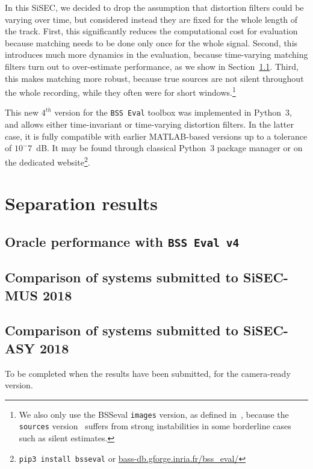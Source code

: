\documentclass{llncs}
\begin{document}
In this SiSEC, we decided to drop the assumption that distortion filters could be varying over time, but considered instead they are fixed for the whole length of the track. First, this significantly reduces the computational cost for evaluation because matching needs to be done only once for the whole signal. Second, this introduces much more dynamics in the evaluation, because time-varying matching filters turn out to over-estimate performance, as we show in Section~\ref{ssec:bsseval-results}. Third, this makes matching more robust, because true sources are not silent throughout the whole recording, while they often were for short windows.\footnote{We also only use the BSSeval \texttt{images} version, as defined in~\cite{bssevalv3}, because the \texttt{sources} version~\cite{bssevalv2} suffers from strong instabilities in some borderline cases such as silent estimates.}

This new $4^{th}$ version for the \texttt{BSS~Eval} toolbox was implemented in Python~3, and allows either time-invariant or time-varying distortion filters. In the latter case, it is fully compatible with earlier MATLAB-based versions up to a tolerance of $10^-7$~dB. It may be found through classical Python~3 package manager or on the dedicated website\footnote{\texttt{pip3 install bsseval} or \url{bass-db.gforge.inria.fr/bss_eval/}}.

\section{Separation results}
\subsection{Oracle performance with \texttt{BSS Eval v4}}
\label{ssec:bsseval-results}
\subsection{Comparison of systems submitted to SiSEC-MUS 2018}
\subsection{Comparison of systems submitted to SiSEC-ASY 2018}
To be completed when the results have been submitted, for the camera-ready version.
\end{document}
